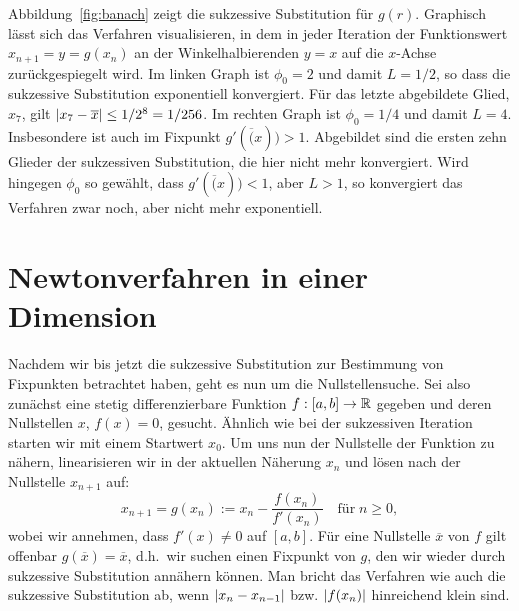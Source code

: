 Abbildung~\ref{fig:banach} zeigt die sukzessive Substitution für
$g(r)$. Graphisch lässt sich das Verfahren visualisieren, in dem in
jeder Iteration der Funktionswert $x_{n+1} = y =g(x_{n})$ an der
Winkelhalbierenden $y=x$ auf die $x$-Achse zurückgespiegelt wird. Im
linken Graph ist $\phi_0=2$ und damit $L=1/2$, so dass die sukzessive
Substitution exponentiell konvergiert. Für das letzte abgebildete
Glied, $x_7$, gilt $\left\lvert{x_7-\overline{x}}\right\rvert \le 1/2^8 = 1/256$. Im
rechten Graph ist $\phi_0=1/4$ und damit $L=4$. Insbesondere ist auch
im Fixpunkt $g'(\overline(x))>1$. Abgebildet sind die ersten zehn
Glieder der sukzessiven Substitution, die hier nicht mehr
konvergiert. Wird hingegen $\phi_0$ so gewählt, dass 
$g'(\overline(x))<1$, aber $L>1$, so konvergiert das Verfahren zwar
noch, aber nicht mehr exponentiell.

\section{Newtonverfahren in einer Dimension}

Nachdem wir bis jetzt die sukzessive Substitution zur Bestimmung von
Fixpunkten betrachtet haben, geht es nun um die Nullstellensuche. Sei
also zunächst eine stetig differenzierbare Funktion $f:[a,b]\to\mathbb{R}$
gegeben und deren Nullstellen $x$, $f(x) = 0$, gesucht. Ähnlich wie
bei der sukzessiven Iteration starten wir mit einem Startwert
$x_0$. Um uns nun der Nullstelle der Funktion zu nähern, linearisieren
wir in der aktuellen Näherung $x_n$ und lösen nach der Nullstelle
$x_{n+1}$ auf:
\begin{equation}
  x_{n+1} = g(x_n) := x_n - \frac{f(x_n)}{f'(x_n)}\quad\text{für}\; n\ge 0,
\end{equation}
wobei wir annehmen, dass $f'(x)\neq 0$ auf $[a,b]$.  Für eine
Nullstelle $\overline{x}$ von $f$ gilt offenbar $g(\overline{x}) =
\overline{x}$, d.h.\ wir suchen einen Fixpunkt von $g$, den wir wieder
durch sukzessive Substitution annähern können. Man bricht das
Verfahren wie auch die sukzessive Substitution ab, wenn
$\left\lvert{x_{n}-x_{n-1}}\right\rvert$ bzw. $\left\lvert{f(x_n)}\right\rvert$ hinreichend klein sind.

